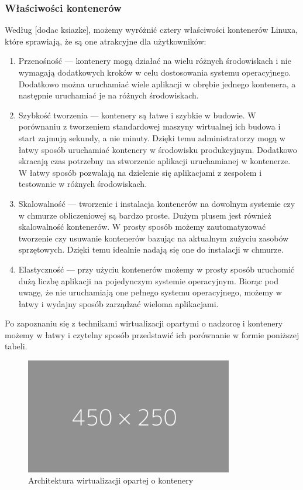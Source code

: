 \documentclass[12pt]{report}
\let\Oldsubsubsection\subsubsection
\renewcommand{\subsubsection}{\FloatBarrier\Oldsubsubsection}
\begin{document}
\subsubsection{Właściwości kontenerów}
Według [dodac ksiazke], możemy wyróżnić cztery właściwości kontenerów Linuxa, które sprawiają, że są one atrakcyjne dla użytkowników:

\begin{enumerate}
\item Przenośność --- kontenery mogą działać na wielu różnych środowiskach i nie wymagają dodatkowych kroków w celu dostosowania systemu operacyjnego. Dodatkowo można uruchamiać wiele aplikacji w obrębie jednego kontenera, a następnie uruchamiać je na różnych środowiskach.

\item Szybkość tworzenia --- kontenery są łatwe i szybkie w budowie. W porównaniu z tworzeniem standardowej maszyny wirtualnej ich budowa i start zajmują sekundy, a nie minuty. Dzięki temu administratorzy mogą w łatwy sposób uruchamiać kontenery w środowisku produkcyjnym. Dodatkowo skracają czas potrzebny na stworzenie aplikacji uruchamianej w kontenerze. W łatwy sposób pozwalają na dzielenie się aplikacjami z zespołem i testowanie w różnych środowiskach.

\item Skalowalność --- tworzenie i instalacja kontenerów na dowolnym systemie czy w chmurze obliczeniowej są bardzo proste. Dużym plusem jest również skalowalność kontenerów. W prosty sposób możemy zautomatyzować tworzenie czy usuwanie kontenerów bazując na aktualnym zużyciu zasobów sprzętowych. Dzięki temu idealnie nadają się one do instalacji w chmurze.

\item Elastyczność --- przy użyciu kontenerów możemy w prosty sposób uruchomić dużą liczbę aplikacji na pojedynczym systemie operacyjnym. Biorąc pod uwagę, że nie uruchamiają one pełnego systemu operacyjnego, możemy w łatwy i wydajny sposób zarządzać wieloma aplikacjami. 
\end{enumerate}

Po zapoznaniu się z technikami wirtualizacji opartymi o nadzorcę i kontenery możemy w łatwy i czytelny sposób przedstawić ich porównanie w formie poniższej tabeli.

\begin{figure}[h]
	\centering
	\includegraphics[width=0.81\textwidth]{images/placeholder-wide.png}
	\caption{Architektura wirtualizacji opartej o kontenery}
\end{figure}
\end{document}
